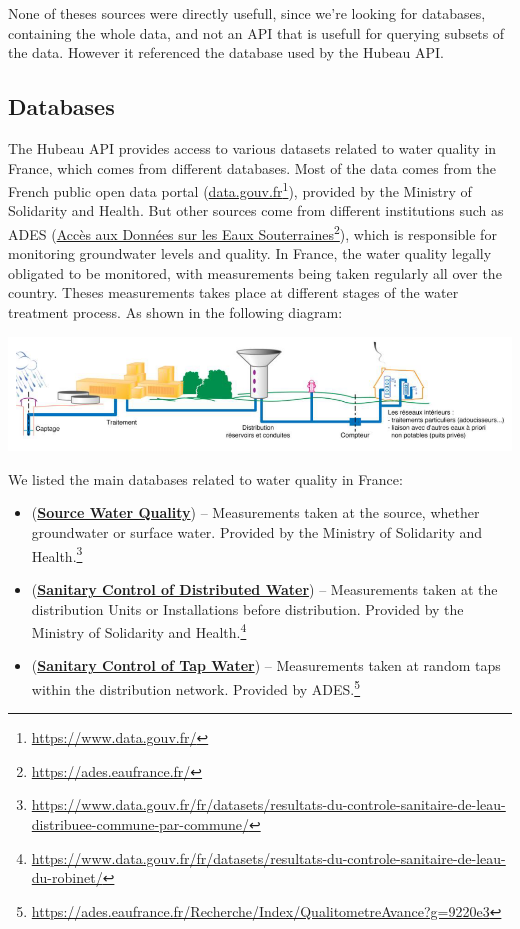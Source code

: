 \documentclass{article}
\begin{document}
None of theses sources were directly usefull, since we're looking for databases, containing the whole data, and not an API that is usefull for querying subsets of the data.
However it referenced the database used by the Hubeau API.

\newpage
\subsection{Databases}
The Hubeau API provides access to various datasets related to water quality in France, which comes from different databases.
Most of the data comes from the French public open data portal (\href{https://www.data.gouv.fr/}{data.gouv.fr}\footnote{\url{https://www.data.gouv.fr/}}), provided by the Ministry of Solidarity and Health. But other sources come from different institutions such as ADES (\href{https://ades.eaufrance.fr/}{Accès aux Données sur les Eaux Souterraines}\footnote{\url{https://ades.eaufrance.fr/}}), which is responsible for monitoring groundwater levels and quality.
In France, the water quality legally obligated to be monitored, with measurements being taken regularly all over the country.
Theses measurements takes place at different stages of the water treatment process. As shown in the following diagram:

\begin{center}
    \includegraphics[width=\textwidth]{Process_eau.png}
\end{center}
We listed the main databases related to water quality in France:
\begin{itemize}
    \item (\href{https://www.data.gouv.fr/fr/datasets/resultats-du-controle-sanitaire-de-leau-distribuee-commune-par-commune/}{\textbf{Source Water Quality}}) -- Measurements taken at the source, whether groundwater or surface water. Provided by the Ministry of Solidarity and Health.\footnote{\url{https://www.data.gouv.fr/fr/datasets/resultats-du-controle-sanitaire-de-leau-distribuee-commune-par-commune/}}
    \item (\href{https://www.data.gouv.fr/fr/datasets/resultats-du-controle-sanitaire-de-leau-du-robinet/}{\textbf{Sanitary Control of Distributed Water}}) -- Measurements taken at the distribution Units or Installations before distribution. Provided by the Ministry of Solidarity and Health.\footnote{\url{https://www.data.gouv.fr/fr/datasets/resultats-du-controle-sanitaire-de-leau-du-robinet/}}
    \item (\href{https://ades.eaufrance.fr/Recherche/Index/QualitometreAvance?g=9220e3}{\textbf{Sanitary Control of Tap Water}}) -- Measurements taken at random taps within the distribution network. Provided by ADES.\footnote{\url{https://ades.eaufrance.fr/Recherche/Index/QualitometreAvance?g=9220e3}}
\end{itemize}
\end{document}
